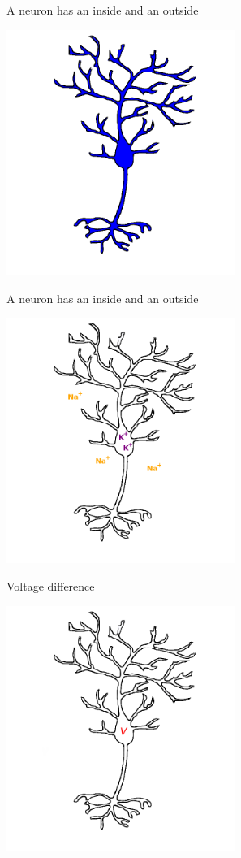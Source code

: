 \documentclass{beamer}
\begin{document}
\begin{frame}{A neuron has an inside and an outside}
  \begin{center}
    \includegraphics[height=8cm]{neuron_filled.png}
  \end{center}
\end{frame}

\begin{frame}{A neuron has an inside and an outside}
  \begin{center}
    \includegraphics[height=8cm]{ions.png}
  \end{center}
\end{frame}


\begin{frame}{Voltage difference}
\begin{center}
    \includegraphics[height=8cm]{voltage.png}
\end{center}
\end{frame}
\end{document}
